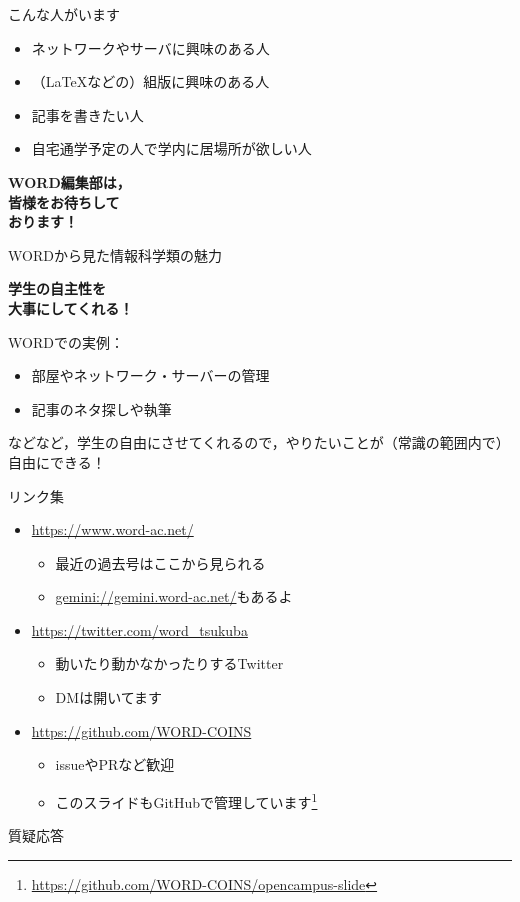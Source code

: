 \documentclass[platex]{beamer}
\begin{document}
\begin{frame}[plain]{こんな人がいます}
 \begin{itemize}
  \item ネットワークやサーバに興味のある人
  \item （\LaTeX などの）組版に興味のある人
  \item 記事を書きたい人
  \item 自宅通学予定の人で学内に居場所が欲しい人
 \end{itemize}
\end{frame}
\begin{frame}[plain]
 \begin{center}
  \Huge\textbf{WORD編集部は，\\皆様をお待ちして\\おります！}
 \end{center}
\end{frame}
\begin{frame}[plain]{WORDから見た情報科学類の魅力}
\pause
 \begin{center}
  \Huge \alert{\textbf{学生の自主性を\\大事にしてくれる！}}
 \end{center}
\pause
WORDでの実例：
\begin{itemize}
 \item 部屋やネットワーク・サーバーの管理
 \item 記事のネタ探しや執筆
\end{itemize}
などなど，学生の自由にさせてくれるので，やりたいことが（常識の範囲内で）自由にできる！
\end{frame}
\begin{frame}[plain]{リンク集}
 \begin{itemize}
  \item \url{https://www.word-ac.net/}
  \begin{itemize}
   \item 最近の過去号はここから見られる
   \item \url{gemini://gemini.word-ac.net/}もあるよ
  \end{itemize}
  \item \url{https://twitter.com/word\_tsukuba}
  \begin{itemize}
   \item 動いたり動かなかったりするTwitter
   \item DMは開いてます
  \end{itemize}
  \item \url{https://github.com/WORD-COINS}
  \begin{itemize}
   \item issueやPRなど歓迎
   \item このスライドもGitHubで管理しています\footnote{\url{https://github.com/WORD-COINS/opencampus-slide}}
  \end{itemize}
 \end{itemize}
\end{frame}
\begin{frame}[plain]
 \begin{center}
  質疑応答
 \end{center}
\end{frame}
\end{document}
